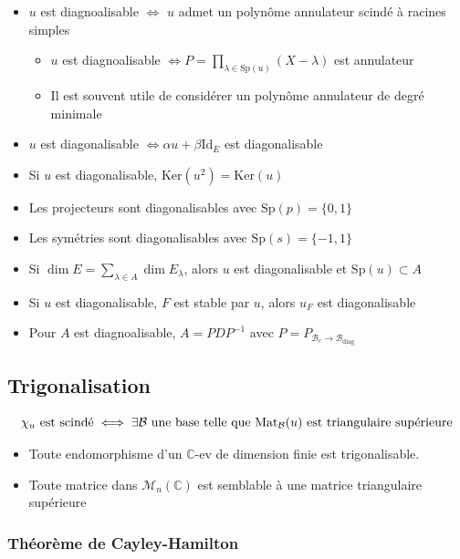 \documentclass[openany]{book}
\begin{document}
\begin{itemize}
    \item $u$ est diagnoalisable $\iff$ $u$ admet un polynôme annulateur scindé à racines simples
    \begin{itemize}
        \item $u$ est diagnoalisable $\iff P = \prod_{\lambda \in \text{Sp}(u)}(X-\lambda)$ est annulateur
        \item Il est souvent utile de considérer un polynôme annulateur de degré minimale
    \end{itemize}
    \item $u$ est diagonalisable $\iff \alpha u + \beta \text{Id}_E$ est diagonalisable
    \item Si $u$ est diagonalisable, $\text{Ker}(u^2) = \text{Ker}(u)$ 
    \item Les projecteurs sont diagonalisables avec $\text{Sp}(p) = \{0, 1\}$
    \item Les symétries sont diagonalisables avec $\text{Sp}(s) = \{-1, 1\}$
    \item Si $\dim E = \sum_{\lambda \in A} \dim E_\lambda$, alors $u$ est diagonalisable et $\text{Sp}(u) \subset A$
    \item Si $u$ est diagonalisable, $F$ est stable par $u$, alors $u_F$ est diagonalisable
    \item Pour $A$ est diagnoalisable, $A = PDP^{-1}$ avec $P=P_{\mathcal{B}_c \rightarrow \mathcal{B}_{\text{diag}}}$
\end{itemize}

\subsection{Trigonalisation}

\[ \chi_u \text{ est scindé} \iff \exists \mathcal{B} \text{ une base telle que } \text{Mat}_{\mathcal{B}}(u) \text{ est triangulaire supérieure} \]

\begin{itemize}
    \item Toute endomorphisme d'un $\mathbb{C}$-ev de dimension finie est trigonalisable.
    \item Toute matrice dans $\mathcal{M}_n(\mathbb{C})$ est semblable à une matrice triangulaire supérieure
\end{itemize}

\subsubsection{Théorème de Cayley-Hamilton}
\end{document}
